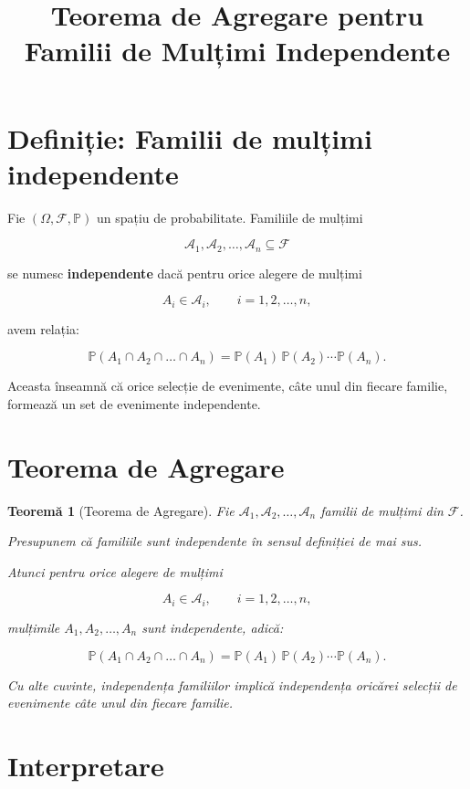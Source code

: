 \documentclass[12pt]{article}
\title{Teorema de Agregare pentru Familii de Mulțimi Independente}
\author{}
\date{}
\theoremstyle{plain}
\newtheorem{theorem}{Teoremă}
\begin{document}
\maketitle

\section{Definiție: Familii de mulțimi independente}

Fie $(\Omega, \mathcal{F}, \mathbb{P})$ un spațiu de probabilitate.
Familiile de mulțimi


\[
\mathcal{A}_1, \mathcal{A}_2, \dots, \mathcal{A}_n \subseteq \mathcal{F}
\]


se numesc \textbf{independente} dacă pentru orice alegere de mulțimi


\[
A_i \in \mathcal{A}_i, \qquad i = 1,2,\dots,n,
\]


avem relația:


\[
\mathbb{P}(A_1 \cap A_2 \cap \dots \cap A_n)
= \mathbb{P}(A_1)\,\mathbb{P}(A_2)\cdots\mathbb{P}(A_n).
\]



Aceasta înseamnă că orice selecție de evenimente, câte unul din fiecare familie,
formează un set de evenimente independente.

\section{Teorema de Agregare}

\begin{theorem}[Teorema de Agregare]
Fie $\mathcal{A}_1, \mathcal{A}_2, \dots, \mathcal{A}_n$ familii de mulțimi
din $\mathcal{F}$.

Presupunem că familiile sunt independente în sensul definiției de mai sus.

Atunci pentru orice alegere de mulțimi


\[
A_i \in \mathcal{A}_i, \qquad i = 1,2,\dots,n,
\]


mulțimile $A_1, A_2, \dots, A_n$ sunt independente, adică:


\[
\mathbb{P}(A_1 \cap A_2 \cap \dots \cap A_n)
= \mathbb{P}(A_1)\,\mathbb{P}(A_2)\cdots\mathbb{P}(A_n).
\]



Cu alte cuvinte, independența familiilor implică independența oricărei
selecții de evenimente câte unul din fiecare familie.
\end{theorem}

\section{Interpretare}
\end{document}
